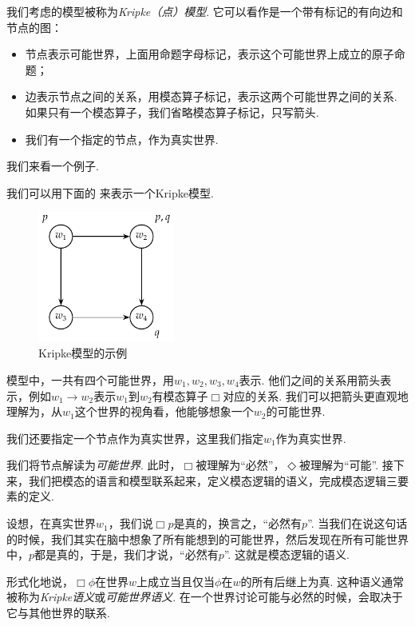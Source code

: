 我们考虑的模型被称为\emph{Kripke（点）模型}. 它可以看作是一个带有标记的有向边和节点的图：
\begin{itemize}
\item 节点表示可能世界，上面用命题字母标记，表示这个可能世界上成立的原子命题；
\item 边表示节点之间的关系，用模态算子标记，表示这两个可能世界之间的关系. 如果只有一个模态算子，我们省略模态算子标记，只写箭头. 
\item 我们有一个指定的节点，作为真实世界. 
\end{itemize}

我们来看一个例子. 

\begin{example}
我们可以用下面的 来表示一个Kripke模型. 

\begin{figure}[ht]
\centering
\includegraphics[width=0.4\textwidth]{figures/modal-logic/Kripke-model-basic.pdf}
\caption{Kripke模型的示例}\label{fig:kripke-model-basic}
\end{figure}

模型中，一共有四个可能世界，用$w_1,w_2,w_3,w_4$表示. 他们之间的关系用箭头表示，例如$w_1\to w_2$表示$w_1$到$w_2$有模态算子$\Box$对应的关系. 我们可以把箭头更直观地理解为，从$w_1$这个世界的视角看，他能够想象一个$w_2$的可能世界. 

我们还要指定一个节点作为真实世界，这里我们指定$w_1$作为真实世界. 
\end{example}

我们将节点解读为\emph{可能世界}. 此时，$\Box$被理解为“必然”，$\Diamond$被理解为“可能”. 接下来，我们把模态的语言和模型联系起来，定义模态逻辑的语义，完成模态逻辑三要素的定义. 

设想，在真实世界$w_1$，我们说$\Box p$是真的，换言之，“必然有$p$”. 当我们在说这句话的时候，我们其实在脑中想象了所有能想到的可能世界，然后发现在所有可能世界中，$p$都是真的，于是，我们才说，“必然有$p$”. 这就是模态逻辑的语义. 

形式化地说，$\Box\phi$在世界$w$上成立当且仅当$\phi$在$w$的所有后继上为真. 这种语义通常被称为\emph{Kripke语义}或\emph{可能世界语义}. 在一个世界讨论可能与必然的时候，会取决于它与其他世界的联系. 

